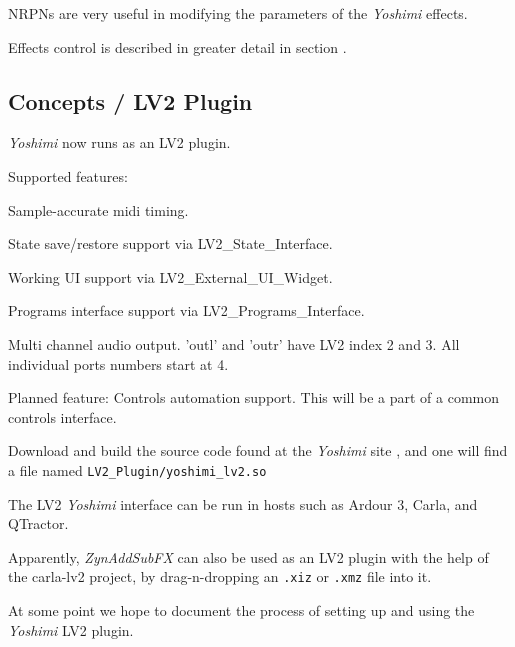    NRPNs are very useful in modifying the parameters of the
   \textsl{Yoshimi} effects.

   Effects control is described in greater detail in section
   .

\subsection{Concepts / LV2 Plugin}
\label{subsec:concepts_lv2_plugin}

   \textsl{Yoshimi} now runs as an LV2 plugin.

Supported features:

   \begin{enumber}
      \item Sample-accurate midi timing.
      \item State save/restore support via LV2\_State\_Interface.
      \item Working UI support via LV2\_External\_UI\_Widget.
      \item Programs interface support via LV2\_Programs\_Interface.
      \item Multi channel audio output. 'outl' and 'outr' have LV2 index 2
         and 3. All individual ports numbers start at 4.
   \end{enumber}

   Planned feature: Controls automation support. This will be a part of a
   common controls interface.

   Download and build the source code found at the
   \textsl{Yoshimi} site \cite{yoshimi},
   and one will find a file named
   \texttt{LV2\_Plugin/yoshimi\_lv2.so}

   The LV2 \textsl{Yoshimi} interface can be run in hosts such as
   Ardour 3, Carla, and QTractor.

   Apparently, \textsl{ZynAddSubFX} can also be used as an LV2 plugin with
   the help of the carla-lv2 project, by drag-n-dropping an
   \texttt{.xiz} or \texttt{.xmz} file into it.

   At some point we hope to document the process of setting up and using
   the \textsl{Yoshimi} LV2 plugin.

